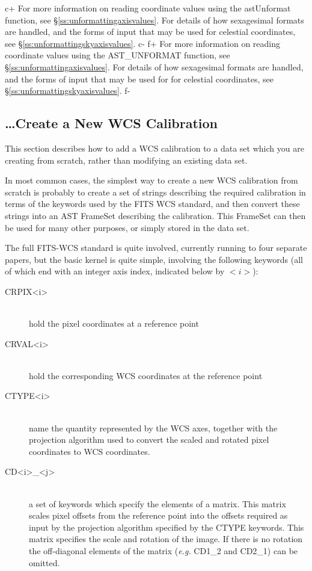 \documentclass[twoside,11pt]{article}
\newcommand{\secref}[1]{\S\ref{#1}}
\newcommand{\secref}[1]{\ref{#1}}
\begin{document}
c+
For more information on reading coordinate values using the
astUnformat function, see \secref{ss:unformattingaxisvalues}. For
details of how sexagesimal formats are handled, and the forms of input
that may be used for celestial coordinates, see
\secref{ss:unformattingskyaxisvalues}.
c-
f+
For more information on reading coordinate values using the
AST\_UNFORMAT function, see \secref{ss:unformattingaxisvalues}. For
details of how sexagesimal formats are handled, and the forms of input
that may be used for for celestial coordinates, see
\secref{ss:unformattingskyaxisvalues}.
f-

\subsection{\label{ss:howtocreatenewwcs}\ldots Create a New WCS Calibration}

This section describes how to add a WCS calibration to a data set which you
are creating from scratch, rather than modifying an existing data set.

In most common cases, the simplest way to create a new WCS calibration
from scratch is probably to create a set of strings describing the
required calibration in terms of the keywords used by the FITS WCS
standard, and then convert these strings into an AST FrameSet describing
the calibration. This FrameSet can then be used for many other purposes, or
simply stored in the data set.

The full FITS-WCS standard is quite involved, currently running to four
separate papers, but the basic kernel is quite simple, involving the
following keywords (all of which end with an integer axis index,
indicated below by $<i>$):

\begin{description}
\item[CRPIX<i>]\mbox{}\\
hold the pixel coordinates at a reference point
\item[CRVAL<i>]\mbox{}\\
hold the corresponding WCS coordinates at the reference point
\item[CTYPE<i>]\mbox{}\\
name the quantity represented by the WCS axes, together with the
projection algorithm used to convert the scaled and rotated pixel coordinates
to WCS coordinates.
\item[CD<i>\_<j>]\mbox{}\\
a set of keywords which specify the elements of a matrix. This matrix scales
pixel offsets from the reference point into the offsets required as input
by the projection algorithm specified by the CTYPE keywords. This matrix
specifies the scale and rotation of the image. If there is no rotation
the off-diagonal elements of the matrix (\emph{e.g.} CD1\_2 and
CD2\_1) can be omitted.
\end{description}
\end{document}
